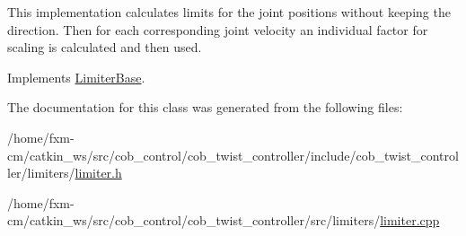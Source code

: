 This implementation calculates limits for the joint positions without keeping the direction. Then for each corresponding joint velocity an individual factor for scaling is calculated and then used. 

Implements \hyperlink{classLimiterBase_a1755edebc0cacfd79f945852ead8ae04}{Limiter\-Base}.



The documentation for this class was generated from the following files\-:\begin{DoxyCompactItemize}
\item 
/home/fxm-\/cm/catkin\-\_\-ws/src/cob\-\_\-control/cob\-\_\-twist\-\_\-controller/include/cob\-\_\-twist\-\_\-controller/limiters/\hyperlink{limiter_8h}{limiter.\-h}\item 
/home/fxm-\/cm/catkin\-\_\-ws/src/cob\-\_\-control/cob\-\_\-twist\-\_\-controller/src/limiters/\hyperlink{limiter_8cpp}{limiter.\-cpp}\end{DoxyCompactItemize}
